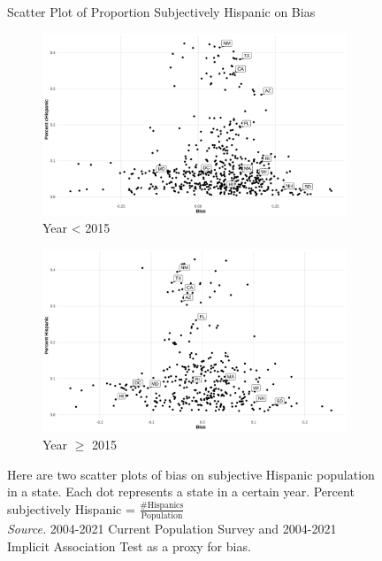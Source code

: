\documentclass[12pt,english]{article}
\begin{document}
\begin{appendices}
\begin{figure}[!htb]
\centering
\caption{Scatter Plot of Proportion Subjectively Hispanic on Bias}
\label{scatter-plot-1}
\begin{subfigure}{.9\textwidth}
\caption{Year < 2015}
\centering
\includegraphics[width=.9\linewidth]{figure/scatter-plot-bias-hispanic-less2015.png}
\end{subfigure}
\centering
\begin{subfigure}{.9\textwidth}
\caption{Year $\geq$ 2015}
\centering
\includegraphics[width=.9\linewidth]{figure/scatter-plot-bias-hispanic-great2015.png}
\end{subfigure}
\caption*{\footnotesize{Here are two scatter plots of bias on subjective Hispanic population in a state. Each dot represents a state in a certain year. Percent subjectively Hispanic = $\frac{\# \text{Hispanics}}{\text{Population}}$ \\
\emph{Source.} 2004-2021 Current Population Survey and 2004-2021 Implicit Association Test as a proxy for bias.}}
\end{figure}

\newpage
\pagebreak


\end{appendices}
\end{document}
